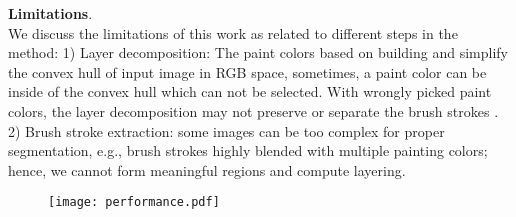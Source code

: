 \textbf{Limitations}.\\ We discuss the limitations of this work as related to different steps in the method:
1) Layer decomposition: The paint colors based on building and simplify the  convex hull of input image in RGB space, sometimes, a paint color can be inside of the convex hull which can not be selected. With wrongly picked paint colors, the layer decomposition may not preserve or separate the brush strokes . 
2) Brush stroke extraction: some images can be too complex for proper segmentation, e.g., brush strokes highly blended with  multiple painting colors; hence, we cannot form meaningful regions and compute layering.

\begin{figure}[H]
	\centering
	\texttt{[image: performance.pdf]}

\end{figure}


